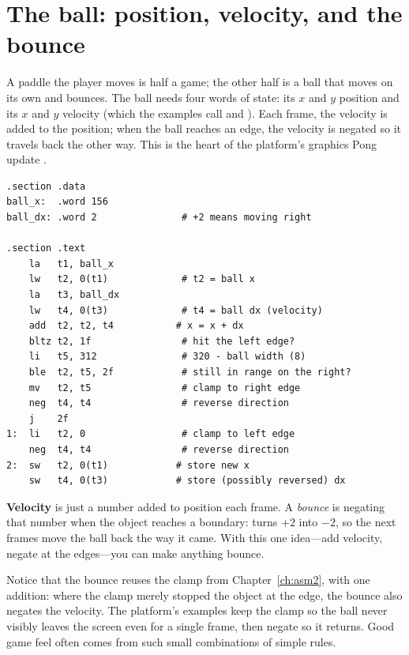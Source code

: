 \section{The ball: position, velocity, and the bounce}

A paddle the player moves is half a game; the other half is a ball that moves on
its own and bounces. The ball needs four words of state: its $x$ and $y$ position
and its $x$ and $y$ velocity (which the examples call  and ).
Each frame, the velocity is added to the position; when the ball reaches an edge,
the velocity is negated so it travels back the other way. This is the heart of
the platform's graphics Pong update \citep{prg32repo}.

\begin{lstlisting}[style=asm,caption={Autonomous ball motion on the x axis with edge bounce. The same pattern, repeated for y, gives full 2-D motion.}]
.section .data
ball_x:  .word 156
ball_dx: .word 2               # +2 means moving right

.section .text
    la   t1, ball_x
    lw   t2, 0(t1)             # t2 = ball x
    la   t3, ball_dx
    lw   t4, 0(t3)             # t4 = ball dx (velocity)
    add  t2, t2, t4           # x = x + dx
    bltz t2, 1f                # hit the left edge?
    li   t5, 312               # 320 - ball width (8)
    ble  t2, t5, 2f            # still in range on the right?
    mv   t2, t5                # clamp to right edge
    neg  t4, t4                # reverse direction
    j    2f
1:  li   t2, 0                 # clamp to left edge
    neg  t4, t4                # reverse direction
2:  sw   t2, 0(t1)            # store new x
    sw   t4, 0(t3)            # store (possibly reversed) dx
\end{lstlisting}

\begin{prgconcept}
\textbf{Velocity} is just a number added to position each frame. A \emph{bounce}
is negating that number when the object reaches a boundary: 
turns $+2$ into $-2$, so the next frames move the ball back the way it came. With
this one idea---add velocity, negate at the edges---you can make anything bounce.
\end{prgconcept}

\begin{prgaside}
Notice that the bounce reuses the clamp from Chapter~\ref{ch:asm2}, with one
addition: where the clamp merely stopped the object at the edge, the bounce also
negates the velocity. The platform's examples keep the clamp so the ball never
visibly leaves the screen even for a single frame, then negate so it returns. Good
game feel often comes from such small combinations of simple rules.
\end{prgaside}

